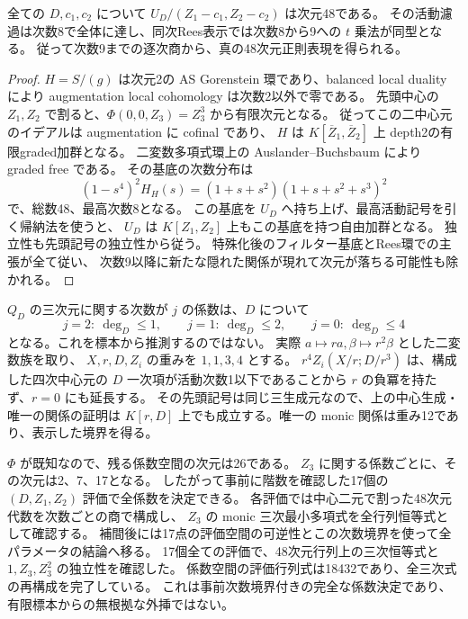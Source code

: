 \begin{lemma}[48次元sliceと有限停止次数]
\label{lem:order4-fortyeight-slice}
全ての $D,c_1,c_2$ について
$U_D/(Z_1-c_1,Z_2-c_2)$ は次元48である。
その活動濾過は次数8で全体に達し、同次Rees表示では次数8から9への $t$ 乗法が同型となる。
従って次数9までの逐次商から、真の48次元正則表現を得られる。
\end{lemma}
\begin{proof}
$H=S/(g)$ は次元2の AS Gorenstein 環であり、balanced local duality により
augmentation local cohomology は次数2以外で零である\cite{YZ}。
先頭中心の $Z_1,Z_2$ で割ると、$\Phi(0,0,Z_3)=Z_3^3$ から有限次元となる。
従ってこの二中心元のイデアルは augmentation に cofinal であり、
$H$ は $K[\overline Z_1,\overline Z_2]$ 上 depth2の有限graded加群となる。
二変数多項式環上の Auslander--Buchsbaum により graded free である。
その基底の次数分布は
\[
 (1-s^4)^2 H_H(s)=(1+s+s^2)(1+s+s^2+s^3)^2
\]
で、総数48、最高次数8となる。
この基底を $U_D$ へ持ち上げ、最高活動記号を引く帰納法を使うと、
$U_D$ は $K[Z_1,Z_2]$ 上もこの基底を持つ自由加群となる。
独立性も先頭記号の独立性から従う。
特殊化後のフィルター基底とRees環での主張が全て従い、
次数9以降に新たな隠れた関係が現れて次元が落ちる可能性も除かれる。
\end{proof}

\begin{remark}[全三次関係の有限補間に必要な事前次数境界]
\label{rem:order4-center-interpolation}
$Q_D$ の三次元に関する次数が $j$ の係数は、$D$ について
\[
 j=2:\ \deg_D\le1,\qquad
 j=1:\ \deg_D\le2,\qquad
 j=0:\ \deg_D\le4
\]
となる。これを標本から推測するのではない。
実際 $a\mapsto r a,\beta\mapsto r^2\beta$ とした二変数族を取り、
$X,r,D,Z_i$ の重みを $1,1,3,4$ とする。
$r^4Z_i(X/r;D/r^3)$ は、構成した四次中心元の $D$ 一次項が活動次数1以下であることから
$r$ の負冪を持たず、$r=0$ にも延長する。
その先頭記号は同じ三生成元なので、上の中心生成・唯一の関係の証明は
$K[r,D]$ 上でも成立する。唯一の monic 関係は重み12であり、表示した境界を得る。

$\Phi$ が既知なので、残る係数空間の次元は26である。
$Z_3$ に関する係数ごとに、その次元は2、7、17となる。
したがって事前に階数を確認した17個の $(D,Z_1,Z_2)$ 評価で全係数を決定できる。
各評価では中心二元で割った48次元代数を次数ごとの商で構成し、
$Z_3$ の monic 三次最小多項式を全行列恒等式として確認する。
補間後には17点の評価空間の可逆性とこの次数境界を使って全パラメータの結論へ移る。
17個全ての評価で、48次元行列上の三次恒等式と $1,Z_3,Z_3^2$ の独立性を確認した。
係数空間の評価行列式は18432であり、全三次式の再構成を完了している。
これは事前次数境界付きの完全な係数決定であり、有限標本からの無根拠な外挿ではない。
\end{remark}

